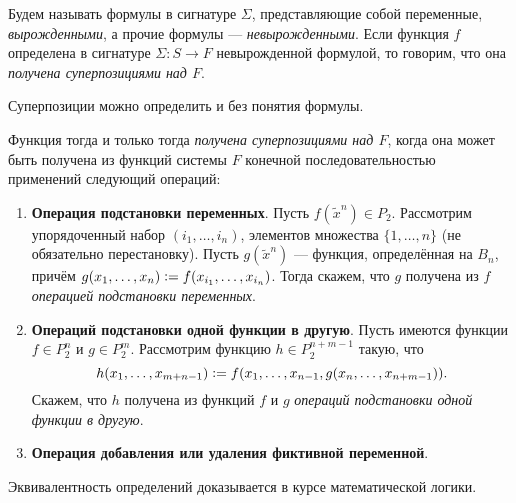 \begin{definition}
    Будем называть формулы в сигнатуре $\Sigma$, представляющие собой переменные, \textit{вырожденными}, а прочие формулы --- \textit{невырожденными}. Если функция $f$ определена в сигнатуре $\Sigma: S \to F$ невырожденной формулой, то говорим, что она \textit{получена суперпозициями над $F$}.
\end{definition}

Суперпозиции можно определить и без понятия формулы.

\begin{definition}
    Функция тогда и только тогда \textit{получена суперпозициями над $F$}, когда она может быть получена из функций системы $F$ конечной последовательностью применений следующий операций:
    \begin{enumerate}[nolistsep]
        \item \textbf{Операция подстановки переменных}. Пусть $f(\widetilde{x}^n) \in P_2$. Рассмотрим упорядоченный набор $(i_1, \ldots, i_n)$, элементов множества $\{1, \ldots, n\}$ (не обязательно перестановку). Пусть $g(\widetilde{x}^n)$ --- функция, определённая на $B_n$, причём $g(x_1, \ldots, x_n) \vcentcolon = f(x_{i_1}, \ldots, x_{i_n})$. Тогда скажем, что $g$ получена из $f$ \textit{операцией подстановки переменных}.
        \item \textbf{Операций подстановки одной функции в другую}. Пусть имеются функции $f \in P_2^n$ и $g \in P_2^m$. Рассмотрим функцию $h \in P_2^{n + m - 1}$ такую, что
            \[
                h(x_1, \ldots, x_{m + n - 1}) \vcentcolon = f(x_1, \ldots, x_{n - 1}, g(x_n, \ldots, x_{n + m - 1})).
            \]
            Скажем, что $h$ получена из функций $f$ и $g$ \textit{операций подстановки одной функции в другую}.
        \item \textbf{Операция добавления или удаления фиктивной переменной}.
    \end{enumerate}
\end{definition}

Эквивалентность определений доказывается в курсе математической логики.

